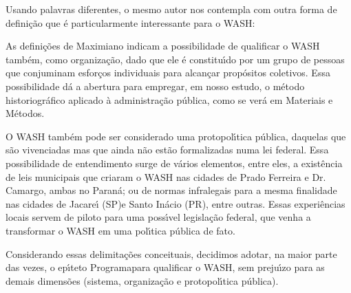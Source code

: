 \documentclass[
12pt,		%
openright,	%
twoside,  %
a4paper,			%
chapter=TITLE,		%
english,			%
french,				%
spanish,			%
brazil				%
]{USPSC-classe/USPSC}
\begin{document}
Usando palavras diferentes, o mesmo autor nos contempla com outra forma de defini\c{c}\~ao que \'e particularmente interessante para o WASH:









\noindent\begin{center}\mbox{\centering{}}\end{center}


As defini\c{c}\~oes de Maximiano indicam a possibilidade de qualificar o WASH tamb\'em, como organiza\c{c}\~ao, dado que ele \'e constitu\'{\i}do por um grupo de pessoas que conjuminam esfor\c{c}os individuais para alcan\c{c}ar prop\'ositos coletivos. Essa possibilidade d\'a a abertura para empregar, em nosso estudo, o m\'etodo historiogr\'afico aplicado \`a administra\c{c}\~ao p\'ublica, como se ver\'a em Materiais e M\'etodos.








O WASH tamb\'em pode ser considerado uma protopol\'{\i}tica p\'ublica, daquelas que s\~ao vivenciadas mas que ainda n\~ao est\~ao formalizadas numa lei federal. Essa possibilidade de entendimento surge de v\'arios elementos, entre eles, a exist\^encia de leis municipais que criaram o WASH nas cidades de Prado Ferreira e Dr. Camargo, ambas no Paran\'a; ou de normas infralegais para a mesma finalidade nas cidades de Jacare\'{\i} (SP)e Santo In\'acio (PR), entre outras. Essas experi\^encias locais servem de piloto para uma poss\'{\i}vel legisla\c{c}\~ao federal, que venha a transformar o WASH em uma pol\'{\i}tica p\'ublica de fato.








Considerando essas delimita\c{c}\~oes conceituais, decidimos adotar, na maior parte das vezes, o ep\'{\i}teto \textquotedbl Programa\textquotedbl  para qualificar o WASH, sem preju\'{\i}zo para as demais dimens\~oes (sistema, organiza\c{c}\~ao e protopol\'{\i}tica p\'ublica).
\end{document}
